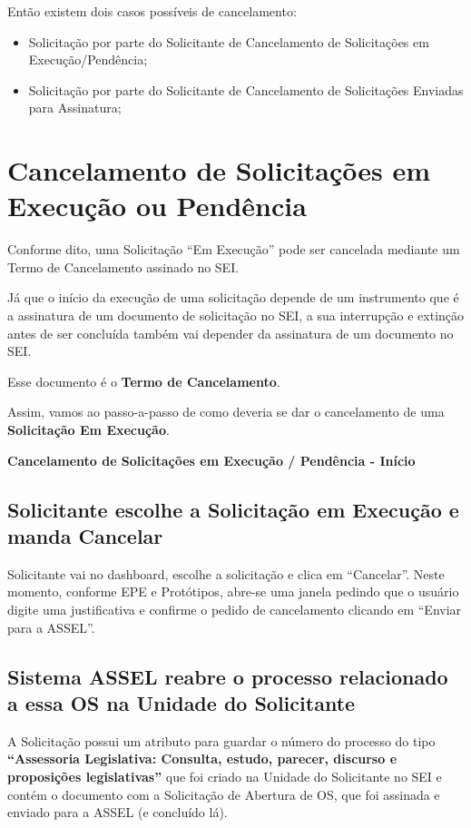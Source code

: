 Então existem dois casos possíveis de cancelamento:

\begin{itemize}
	\item Solicitação por parte do Solicitante de Cancelamento de Solicitações em Execução/Pendência;
	\item Solicitação por parte do Solicitante de Cancelamento de Solicitações Enviadas para Assinatura;
\end{itemize}


\section{Cancelamento de Solicitações em Execução ou Pendência}	

Conforme dito, uma Solicitação ``Em Execução'' pode ser cancelada mediante um Termo de Cancelamento assinado no SEI.

Já que o início da execução de uma solicitação depende de um instrumento que é a assinatura de um documento de solicitação no SEI, a sua interrupção e extinção antes de ser concluída também vai depender da assinatura de um documento no SEI. 

Esse documento é o \textbf{Termo de Cancelamento}.   

Assim, vamos ao passo-a-passo de como deveria se dar o cancelamento de uma \textbf{Solicitação Em Execução}.


\large
\begin{center}
	\textbf{Cancelamento de Solicitações em Execução / Pendência - Início}
\end{center}
\normalsize


\subsection{Solicitante escolhe a Solicitação em Execução e manda Cancelar}	

Solicitante vai no dashboard, escolhe a solicitação e clica em ``Cancelar''. Neste momento, conforme EPE e Protótipos, abre-se uma janela pedindo que o usuário digite uma justificativa e confirme o pedido de cancelamento clicando em ``Enviar para a ASSEL''.

\subsection{Sistema ASSEL reabre o processo relacionado a essa OS na Unidade do Solicitante}

A Solicitação possui um atributo para guardar o número do processo do tipo \textbf{``Assessoria Legislativa: Consulta, estudo, parecer, discurso e proposições legislativas''} que foi criado na Unidade do Solicitante no SEI e contém o documento com a Solicitação de Abertura de OS, que foi assinada e enviado para a ASSEL (e concluído lá).

